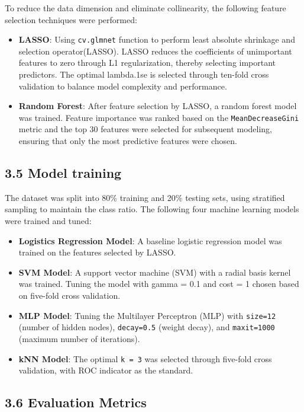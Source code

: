 \documentclass[
  doc]{apa6}
\begin{document}
To reduce the data dimension and eliminate collinearity, the following feature selection techniques were performed:

\begin{itemize}
\item
  \textbf{LASSO}: Using \texttt{cv.glmnet} function to perform least absolute shrinkage and selection operator(LASSO). LASSO reduces the coefficients of unimportant features to zero through L1 regularization, thereby selecting important predictors. The optimal lambda.1se is selected through ten-fold cross validation to balance model complexity and performance.
\item
  \textbf{Random Forest}: After feature selection by LASSO, a random forest model was trained. Feature importance was ranked based on the \texttt{MeanDecreaseGini} metric and the top 30 features were selected for subsequent modeling, ensuring that only the most predictive features were chosen.
\end{itemize}

\subsection{3.5 Model training}\label{model-training}

The dataset was split into 80\% training and 20\% testing sets, using stratified sampling to maintain the class ratio. The following four machine learning models were trained and tuned:

\begin{itemize}
\item
  \textbf{Logistics Regression Model}: A baseline logistic regression model was trained on the features selected by LASSO.
\item
  \textbf{SVM Model}: A support vector machine (SVM) with a radial basis kernel was trained. Tuning the model with gamma = 0.1 and cost = 1 chosen based on five-fold cross validation.
\item
  \textbf{MLP Model}: Tuning the Multilayer Perceptron (MLP) with \texttt{size=12} (number of hidden nodes), \texttt{decay=0.5} (weight decay), and \texttt{maxit=1000} (maximum number of iterations).
\item
  \textbf{kNN Model}: The optimal \texttt{k\ =\ 3} was selected through five-fold cross validation, with ROC indicator as the standard.
\end{itemize}

\subsection{3.6 Evaluation Metrics}\label{evaluation-metrics}
\end{document}
